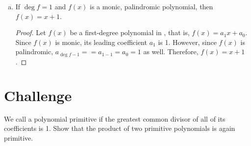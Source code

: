 \begin{enumerate}[(a)]
\begin{proof}
          It follows that each term cancels its palindromic term, and the resulting sum is 0.
        \end{proof}
  \item If $\deg f = 1$ and $f(x)$ is a monic, palindromic polynomial, then $f(x) = x+1$.
        \begin{proof}
          Let $f(x)$ be a first-degree polynomial in \C, that is, $f(x) = a_1x + a_0$.
          Since $f(x)$ is monic, its leading coefficient $a_1$ is 1.
          However, since $f(x)$ is palindromic, $a_{\deg f - 1} = = a_{1-1} = a_0 = 1$ as well.
          Therefore, $f(x) = x + 1$.
        \end{proof}
\end{enumerate}


\section{Challenge}

\begin{challenge}
  We call a polynomial primitive if the greatest common divisor of all of its coefficients is 1.
  Show that the product of two primitive polynomials is again primitive.
\end{challenge}

